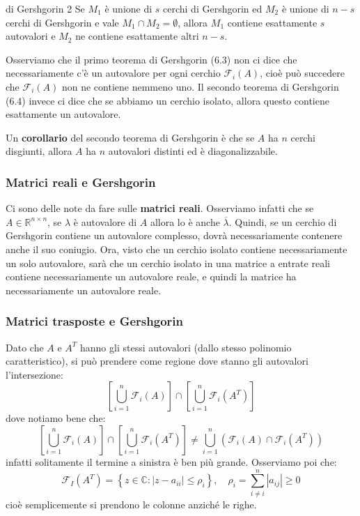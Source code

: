 \documentclass[a4paper,11pt]{article}
\begin{document}
\begin{theorem}{di Gershgorin 2}
	Se $M_1$ è unione di $s$ cerchi di Gershgorin ed $M_2$ è unione di $n - s$ cerchi di Gershgorin e vale $M_1 \cap M_2 = \emptyset$, allora $M_1$ contiene esattamente $s$ autovalori e $M_2$ ne contiene esattamente altri $n - s$. 
\end{theorem}

Osserviamo che il primo teorema di Gershgorin (6.3) non ci dice che necessariamente c'è un autovalore per ogni cerchio $\mathcal{F}_i(A)$, cioè può succedere che $\mathcal{F}_i(A)$ non ne contiene nemmeno uno.
Il secondo teorema di Gershgorin (6.4) invece ci dice che se abbiamo un cerchio isolato, allora questo contiene esattamente un autovalore.

Un \textbf{corollario} del secondo teorema di Gershgorin è che se $A$ ha $n$ cerchi disgiunti, allora $A$ ha $n$ autovalori distinti ed è diagonalizzabile. 

\subsubsection{Matrici reali e Gershgorin}
Ci sono delle note da fare sulle \textbf{matrici reali}.
Osserviamo infatti che se $A \in \mathbb{R}^{n \times n}$, se $\lambda$ è autovalore di $A$ allora lo è anche $\overline{\lambda}$.
Quindi, se un cerchio di Gershgorin contiene un autovalore complesso, dovrà necessariamente contenere anche il suo coniugio.
Ora, visto che un cerchio isolato contiene necessariamente un solo autovalore, sarà che un cerchio isolato in una matrice a entrate reali contiene necessariamente un autovalore reale, e quindi la matrice ha necessariamente un autovalore reale.

\subsubsection{Matrici trasposte e Gershgorin}
Dato che $A$ e $A^T$ hanno gli stessi autovalori (dallo stesso polinomio caratteristico), si può prendere come regione dove stanno gli autovalori l'intersezione:
$$
\left[ \bigcup_{i = 1}^n \mathcal{F}_i(A) \right] \cap \left[ \bigcup_{i = 1}^n \mathcal{F}_i(A^T) \right]
$$
dove notiamo bene che:
$$
\left[ \bigcup_{i = 1}^n \mathcal{F}_i(A) \right] \cap \left[ \bigcup_{i = 1}^n \mathcal{F}_i(A^T) \right] \neq 
\bigcup_{i = 1}^n \left( \mathcal{F}_i(A) \cap \mathcal{F}_i(A^T) \right)
$$
infatti solitamente il termine a sinistra è ben più grande.
Osserviamo poi che:
$$
\mathcal{F}_I(A^T) = \left\{ z \in \mathbb{C} : |z - a_{ii}| \leq \rho_i \right\}, \quad \rho_i = \sum_{i \neq i}^n |a_{ij}| \geq 0
$$
cioè semplicemente si prendono le colonne anziché le righe. 
\end{document}
